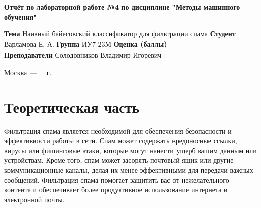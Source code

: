 \documentclass[12pt]{report}
\begin{document}
\begin{titlepage}
	
	\begin{center}
		\noindent\begin{minipage}{1.3\textwidth}\centering
			\Large\textbf{  Отчёт по лабораторной работе №4 по дисциплине}\newline
			\textbf{ "Методы машинного обучения"}\newline\newline
		\end{minipage}
	\end{center}
	
	\noindent\textbf{Тема} $\underline{\text{Наивный байесовский классификатор для фильтрации спама}}$\newline\newline
	\noindent\textbf{Студент} $\underline{\text{Варламова Е. А.}}$\newline\newline
	\noindent\textbf{Группа} $\underline{\text{ИУ7-23М}}$\newline\newline
	\noindent\textbf{Оценка (баллы)} $\underline{\text{~~~~~~~~~~~~~~~~~~~~~~~~~~~}}$\newline\newline
	\noindent\textbf{Преподаватели} $\underline{\text{Солодовников Владимир Игоревич}}$\newline\newline\newline
	
	\begin{center}
		\vfill
		Москва~---~\the\year
		~г.
	\end{center}
\end{titlepage}
\large
\setcounter{page}{2}
\def\contentsname{СОДЕРЖАНИЕ}
\renewcommand{\contentsname}{СОДЕРЖАНИЕ}
\tableofcontents
\renewcommand\labelitemi{---}
\newpage
\chapter{Теоретическая часть}

Фильтрация спама является необходимой для обеспечения безопасности и эффективности работы в сети. Спам может содержать вредоносные ссылки, вирусы или фишинговые атаки, которые могут нанести ущерб вашим данным или устройствам. Кроме того, спам может засорять почтовый ящик или другие коммуникационные каналы, делая их менее эффективными для передачи важных сообщений. Фильтрация спама помогает защитить вас от нежелательного контента и обеспечивает более продуктивное использование интернета и электронной почты.
\end{document}
